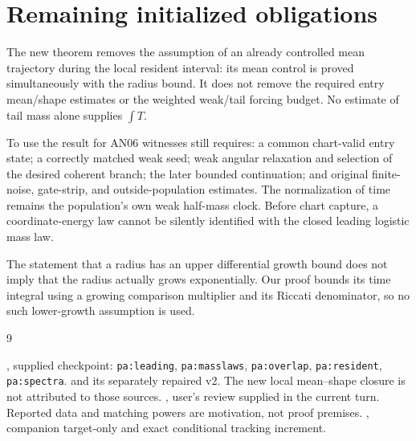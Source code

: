 \documentclass[11pt]{article}
\numberwithin{equation}{section}
\theoremstyle{remark}\newtheorem{remark}[theorem]{Remark}
\begin{document}
\section{Remaining initialized obligations}\label{inc:AN03:local:v1:residue}
The new theorem removes the assumption of an already controlled mean
trajectory during the local resident interval: its mean control is proved
simultaneously with the radius bound. It does not remove the required
entry mean/shape estimates or the weighted weak/tail forcing budget.
No estimate of tail mass alone supplies $\int T$.

To use the result for AN06 witnesses still requires: a common chart-valid
entry state; a correctly matched weak seed; weak angular relaxation and
selection of the desired coherent branch; the later bounded continuation;
and original finite-noise, gate-strip, and outside-population estimates.
The normalization of time remains the population's own weak half-mass
clock. Before chart capture, a coordinate-energy law cannot be silently
identified with the closed leading logistic mass law.

The statement that a radius has an upper differential growth bound does
not imply that the radius actually grows exponentially. Our proof bounds
its time integral using a growing comparison multiplier and its Riccati
denominator, so no such lower-growth assumption is used.

\begin{thebibliography}{9}\small\raggedright
\setlength{\itemsep}{2pt}\setlength{\parskip}{0pt}
, supplied checkpoint:
\texttt{pa:leading}, \texttt{pa:masslaws}, \texttt{pa:overlap},
\texttt{pa:resident}, \texttt{pa:spectra}.
 and
its separately repaired v2. The new local mean--shape closure is not
attributed to those sources.
, user's review supplied in the
current turn. Reported data and matching powers are motivation, not proof
premises.
,
companion target-only and exact conditional tracking increment.
\end{thebibliography}
\end{document}
